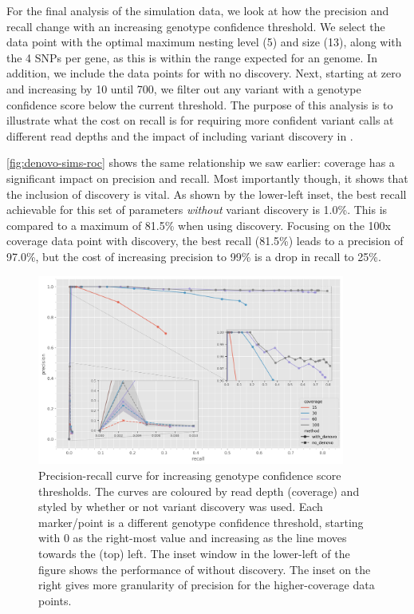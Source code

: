 For the final analysis of the simulation data, we look at how the precision and recall change with an increasing genotype confidence threshold. We select the data point with the optimal maximum nesting level (5) and \denovo{} \kmer{} size (13), along with the 4 SNPs per gene, as this is within the range expected for an \ecoli{} genome. In addition, we include the data points for \pandora{} with no \denovo{} discovery. Next, starting at zero and increasing by 10 until 700, we filter out any variant with a genotype confidence score below the current threshold. The purpose of this analysis is to illustrate what the cost on recall is for requiring more confident variant calls at different read depths and the impact of including \denovo{} variant discovery in \pandora{}. 

\autoref{fig:denovo-sims-roc} shows the same relationship we saw earlier: coverage has a significant impact on precision and recall. Most importantly though, it shows that the inclusion of \denovo{} discovery is vital. As shown by the lower-left inset, the best recall achievable for this set of parameters \emph{without} variant discovery is 1.0\%. This is compared to a maximum of 81.5\% when using \denovo{} discovery. Focusing on the 100x coverage data point with \denovo{} discovery, the best recall (81.5\%) leads to a precision of 97.0\%, but the cost of increasing precision to 99\% is a drop in recall to 25\%. 

\begin{figure}
    \centering
    \includegraphics[width=0.9\textwidth]{Chapter1/Figs/denovo-sims-roc.png}
    \caption{Precision-recall curve for increasing genotype confidence score thresholds. The curves are coloured by read depth (coverage) and styled by whether or not \denovo{} variant discovery was used. Each marker/point is a different genotype confidence threshold, starting with 0 as the right-most value and increasing as the line moves towards the (top) left. The inset window in the lower-left of the figure shows the performance of \pandora{} without \denovo{} discovery. The inset on the right gives more granularity of precision for the higher-coverage data points.}
    \label{fig:denovo-sims-roc}
\end{figure}

